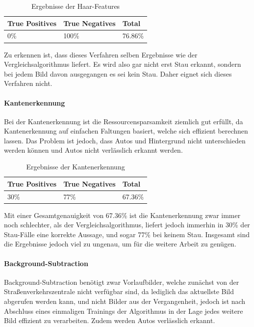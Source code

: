 \begin{table}[ht]
  \centering
\scriptsize
    \begin{tabular}{ | l | l | l |}
    \hline
		True Positives & True Negatives & Total \\ \hline
    0\% &
		100\% &
		76.86\% \\
    \hline
    \end{tabular}
  \caption{Ergebnisse der Haar-Features}
\end{table}

Zu erkennen ist, dass dieses Verfahren selben Ergebnisse wie der Vergleichsalgorithmus liefert. Es wird also gar nicht erst Stau erkannt, sondern bei jedem Bild davon ausgegangen es sei kein Stau. Daher eignet sich dieses Verfahren nicht.

\paragraph{Kantenerkennung}
Bei der Kantenerkennung ist die Ressourcensparsamkeit ziemlich gut erfüllt, da Kantenerkennung auf einfachen Faltungen basiert, welche sich effizient berechnen lassen.
Das Problem ist jedoch, dass Autos und Hintergrund nicht unterschieden werden können und Autos nicht verlässlich erkannt werden.

\begin{table}[ht]
  \centering
    \scriptsize
    \begin{tabular}{ | l | l | l |}
    \hline
		True Positives & True Negatives & Total \\ \hline
    30\% &
		77\% &
		67.36\% \\
    \hline
    \end{tabular}
  \caption{Ergebnisse der Kantenerkennung}
\end{table}

Mit einer Gesamtgenauigkeit von 67.36\% ist die Kantenerkennung zwar immer noch schlechter, als der Vergleichsalgorithmus, liefert jedoch immerhin in 30\% der Stau-Fälle eine korrekte Aussage, und sogar 77\% bei keinem Stau. Insgesamt sind die Ergebnisse jedoch viel zu ungenau, um für die weitere Arbeit zu genügen.

\paragraph{Background-Subtraction}
Background-Subtraction benötigt zwar Vorlaufbilder, welche zunächst von der Straßenverkehrszentrale nicht verfügbar sind, da lediglich das aktuellste Bild abgerufen werden kann, und nicht Bilder aus der Vergangenheit, jedoch ist nach Abschluss eines einmaligen Trainings der Algorithmus in der Lage jedes weitere Bild effizient zu verarbeiten. Zudem werden Autos verlässlich erkannt.

